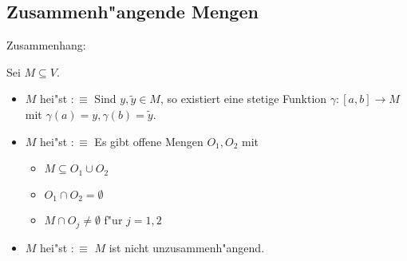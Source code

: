 \subsection{Zusammenh"angende Mengen}
 Zusammenhang:{
  Sei $M\subseteq V$.
  \begin{itemize}
    \item $M$ hei"st  $:\equiv$ 
      Sind $y,\tilde y\in M$,
      so existiert eine stetige Funktion $\gamma:[a,b]\to M$ mit
      $\gamma(a)=y,\gamma(b)=\tilde y$.
    \item $M$ hei"st  $:\equiv$ 
      Es gibt offene Mengen $O_1,O_2$ mit
      \begin{itemize}
        \item $M\subseteq O_1\cup O_2$
        \item $O_1\cap O_2=\emptyset$
        \item $M\cap O_j\neq\emptyset$ f"ur $j=1,2$
        \end{itemize}
    \item $M$ hei"st  $:\equiv$ 
      $M$ ist nicht unzusammenh"angend.
    \end{itemize}
  }
